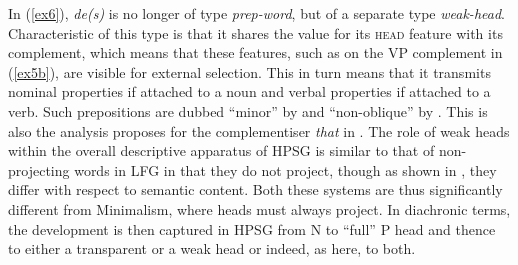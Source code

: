 \documentclass[output=paper]{langsci/langscibook}
\begin{document}
In (\ref{ex6}), \emph{de(s)} is no longer of type \emph{prep-word}, but of a
separate type \emph{weak-head}. Characteristic of this type is that it shares
the value for its \textsc{head} feature with its complement, which means that
these features, such as \Inf{} on the VP complement in (\ref{ex5b}), are
visible for external selection. This in turn means that it transmits nominal
properties if attached to a noun and verbal properties if attached to a verb.
Such prepositions are dubbed \enquote{minor} by \cite{vanEynde04} and
\enquote{non-oblique} by \cite{Abeilleetal06}. This is also the analysis
\cite{Tseng02} proposes for the complementiser \emph{that} in . The role
of weak heads within the overall descriptive apparatus of \gls{HPSG} is similar
to that of non-projecting words in \gls{LFG} in that they do not project,
though as shown in , they differ with respect to
semantic content.  Both these systems are thus significantly different from
Minimalism, where heads must always project. In diachronic terms, the
development is then captured in \gls{HPSG} from N to \enquote{full} P head and
thence to either a transparent or a weak head or indeed, as here, to both.
\end{document}
